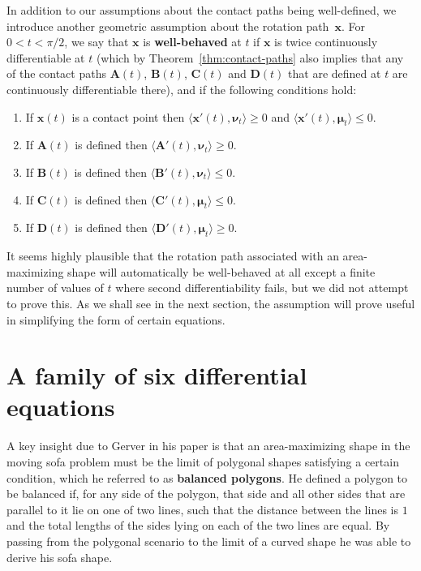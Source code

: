 \documentclass[11pt]{article}
\newcommand{\nvecone}{\boldsymbol{\mu}}
\newcommand{\nvectwo}{\boldsymbol{\nu}}
\begin{document}
\bigskip
In addition to our assumptions about the contact paths being well-defined, we introduce another geometric assumption about the rotation path~$\mathbf{x}$. For $0<t<\pi/2$, we say that $\mathbf{x}$ is \textbf{well-behaved} at $t$ if $\mathbf{x}$ is twice continuously differentiable at $t$ (which by Theorem~\ref{thm:contact-paths} also implies that any of the contact paths $\mathbf{A}(t)$, $\mathbf{B}(t)$, $\mathbf{C}(t)$ and $\mathbf{D}(t)$  that are defined at $t$ are continuously differentiable there), and if the following conditions hold:
\begin{enumerate}
\item If $\mathbf{x}(t)$ is a contact point then $\big\langle \mathbf{x}'(t), \nvectwo_t \big\rangle \ge 0$ and $\big\langle \mathbf{x}'(t), \nvecone_t \big\rangle \le 0$.
\item If $\mathbf{A}(t)$ is defined then $\big\langle \mathbf{A}'(t), \nvectwo_t \big\rangle \ge 0$.
\item If $\mathbf{B}(t)$ is defined then $\big\langle \mathbf{B}'(t), \nvectwo_t \big\rangle \le 0$.
\item If $\mathbf{C}(t)$ is defined then $\big\langle \mathbf{C}'(t), \nvecone_t \big\rangle \le 0$.
\item If $\mathbf{D}(t)$ is defined then $\big\langle \mathbf{D}'(t), \nvecone_t \big\rangle \ge 0$.
\end{enumerate}

It seems highly plausible that the rotation path associated with an area-maximizing shape will automatically be well-behaved at all except a finite number of values of $t$ where second differentiability fails, but we did not attempt to prove this. As we shall see in the next section, the assumption will prove useful in simplifying the form of certain equations.

\section{A family of six differential equations}

\label{sec:odes}

A key insight due to Gerver in his paper \cite{gerver} is that an area-maximizing shape in the moving sofa problem must be the limit of polygonal shapes satisfying a certain condition, which he referred to as \textbf{balanced polygons}. He defined a polygon to be balanced if, for any side of the polygon, that side and all other sides that are parallel to it lie on one of two lines, such that the distance between the lines is $1$ and the total lengths of the sides lying on each of the two lines are equal. By passing from the polygonal scenario to the limit of a curved shape he was able to derive his sofa shape.
\end{document}
